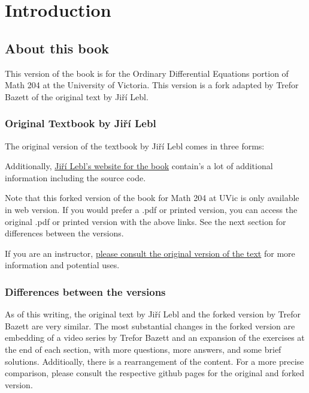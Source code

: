 \chapter*{Introduction} \label{intro:chapter}


\section{About this book}
\label{notes:section}

This version of the book is for the Ordinary Differential Equations portion of Math 204 at the University of Victoria. This version is a fork adapted by Trefor Bazett of the original text by Jiří Lebl.

\subsection{Original Textbook by Jiří Lebl}

The original version of the textbook by  Jiří Lebl comes in three forms:

\begin{enumerate}
    \item \href{https://www.jirka.org/diffyqs/html/diffyqs.html}{The Web Version}.
    \item \href{https://www.jirka.org/diffyqs/diffyqs.pdf}{A PDF}.
    \item \href{https://smile.amazon.com/dp/1706230230\}{A printed paperback on Amazon }.
    \end{enumerate}

Additionally, \href{https://www.jirka.org/diffyqs/}{Jiří Lebl's website for the book} contain's a lot of additional information including the source code. 

Note that this forked version of the book for Math 204 at UVic is only available in web version. If you would prefer a .pdf or printed version, you can access the original .pdf or printed version with the above links. See the next section for differences between the versions.

If you are an instructor,  \href{https://www.jirka.org/diffyqs/html/notes_section.html}{please consult the original version of the text} for more information and potential uses.

\subsection{Differences between the versions}
As of this writing, the original text by Jiří Lebl and the forked version by Trefor Bazett are very similar. The most substantial changes in the forked version are embedding of a video series by Trefor Bazett and an expansion of the exercises at the end of each section, with more questions, more answers, and some brief solutions. Additioally, there is a rearrangement of the content. For a more precise comparison, please consult the respective github pages for the original and forked version. 

